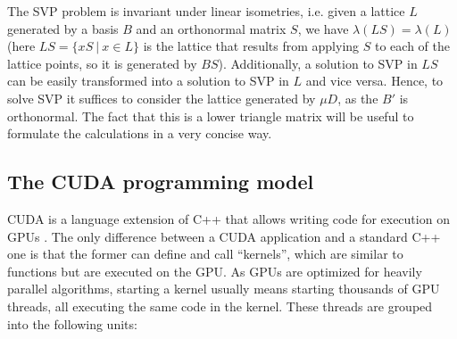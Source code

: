 \documentclass{scrartcl}
\begin{document}
    The SVP problem is invariant under linear isometries, i.e. given a lattice $L$ generated by a basis $B$ and an orthonormal matrix $S$, we have $\lambda(L S) = \lambda(L)$ 
    (here $L S = \{ x S \ | \ x \in L \}$ is the lattice that results from applying $S$ to each of the lattice points, so it is generated by $B S$). 
    Additionally, a solution to SVP in $L S$ can be easily transformed into a solution to SVP in $L$ and vice versa.
    Hence, to solve SVP it suffices to consider the lattice generated by $\mu D$, as the $B'$ is orthonormal.
    The fact that this is a lower triangle matrix will be useful to formulate the calculations in a very concise way.

    \subsection{The CUDA programming model}

    CUDA is a language extension of C++ that allows writing code for execution on GPUs \cite{cuda}. The only difference between a CUDA application and a standard C++ one is that the former can define and call ``kernels'', which are similar to functions but are executed on the GPU. As GPUs are optimized for heavily parallel algorithms, starting a kernel usually means starting thousands of GPU threads, all executing the same code in the kernel. These threads are grouped into the following units:
\end{document}

